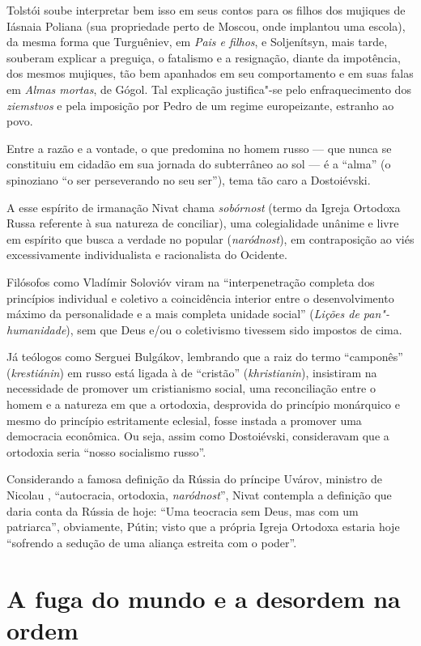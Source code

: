 Tolstói soube interpretar bem isso em seus contos para os filhos dos mujiques de Iásnaia Poliana (sua propriedade perto de Moscou, onde implantou uma escola), da mesma forma que Turguêniev, em \emph{Pais e filhos}, e Soljenítsyn, mais tarde, souberam explicar a preguiça, o fatalismo e a resignação, diante da impotência, dos mesmos mujiques, tão bem apanhados em seu comportamento e em suas falas em \emph{Almas mortas}, de Gógol. Tal explicação justifica"-se pelo enfraquecimento dos \emph{ziemstvos} e pela imposição por Pedro  de um regime europeizante, estranho ao povo.

Entre a razão e a vontade, o que predomina no homem russo --- que nunca se constituiu em cidadão em sua jornada do subterrâneo ao sol --- é a ``alma'' (o spinoziano ``o ser perseverando no seu ser''), tema tão caro a Dostoiévski.

A esse espírito de irmanação Nivat chama \emph{sobórnost} (termo da Igreja Ortodoxa Russa referente à sua natureza de conciliar), uma colegialidade unânime e livre em espírito que busca a verdade no popular (\emph{naródnost}), em contraposição ao viés excessivamente individualista e racionalista do Ocidente.

Filósofos como Vladímir Solovióv viram na ``interpenetração completa dos princípios individual e coletivo a coincidência interior entre o desenvolvimento máximo da personalidade e a mais completa unidade social'' (\emph{Lições de pan"-humanidade}), sem que Deus e/ou o coletivismo tivessem sido impostos de cima.

Já teólogos como Serguei Bulgákov, lembrando que a raiz do termo ``camponês'' (\emph{krestiánin}) em russo está ligada à de ``cristão'' (\emph{khristianin}), insistiram na necessidade de promover um cristianismo social, uma reconciliação entre o homem e a natureza em que a ortodoxia, desprovida do princípio monárquico e mesmo do princípio estritamente eclesial, fosse instada a promover uma democracia econômica. Ou seja, assim como Dostoiévski, consideravam que a ortodoxia seria ``nosso socialismo russo''.

Considerando a famosa definição da Rússia do príncipe Uvárov, ministro de Nicolau , ``autocracia, ortodoxia, \emph{naródnost}'', Nivat contempla a definição que daria conta da Rússia de hoje: ``Uma teocracia sem Deus, mas com um patriarca'', obviamente, Pútin; visto que a própria Igreja Ortodoxa estaria hoje ``sofrendo a sedução de uma aliança estreita com o poder''.

\section{\uppercase{A} fuga do mundo e a desordem na ordem}

